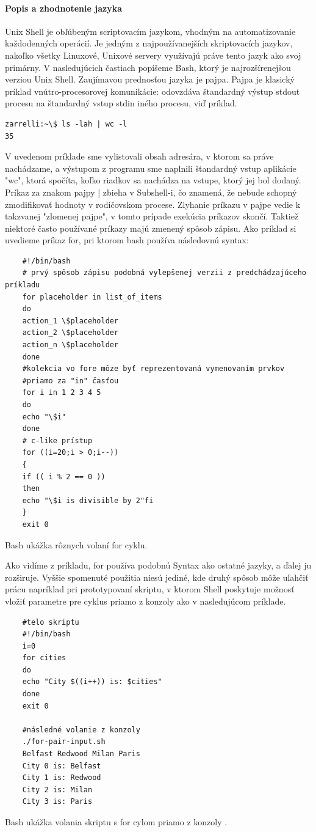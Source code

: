 \paragraph{Popis a zhodnotenie jazyka}
\indent
Unix Shell je obľúbeným scriptovacím jazykom, vhodným na automatizovanie každodenných operácií. Je jedným z najpoužívanejších skriptovacích jazykov, nakoľko všetky Linuxové, Unixové servery využívajú práve tento jazyk ako svoj primárny. V nasledujúcich častiach popíšeme Bash, ktorý je najrozšírenejšou verziou Unix Shell. Zaujímavou prednosťou jazyka je pajpa. Pajpa je klasický príklad vnútro-procesorovej komunikácie: odovzdáva štandardný výstup stdout procesu na štandardný vstup stdin iného procesu, viď príklad.
\begin{verbatim}
zarrelli:~\$ ls -lah | wc -l
35
\end{verbatim}
V uvedenom príklade sme vylistovali obsah adresára, v ktorom sa práve nachádzame, a výstupom z programu sme naplnili štandardný vstup aplikácie "wc", ktorá spočíta, koľko riadkov sa nachádza na vstupe, ktorý jej bol dodaný. Príkaz za znakom pajpy | zbieha v Subshell-i, čo znamená, že nebude schopný zmodifikovať hodnoty v rodičovskom procese. Zlyhanie príkazu v pajpe vedie k takzvanej "zlomenej pajpe", v tomto prípade exekúcia príkazov skončí. \cite{mbash}
\newpage
Taktiež niektoré často používané príkazy majú zmenený spôsob zápisu.
Ako príklad si uvedieme príkaz for, pri ktorom bash používa následovnú syntax:

\begin{algorithm}[H]
	\begin{verbatim}
	#!/bin/bash
	# prvý spôsob zápisu podobná vylepšenej verzii z predchádzajúceho príkladu
	for placeholder in list_of_items
	do
	action_1 \$placeholder
	action_2 \$placeholder
	action_n \$placeholder
	done
	#kolekcia vo fore môze byť reprezentovaná vymenovaním prvkov 
	#priamo za "in" časťou
	for i in 1 2 3 4 5
	do
	echo "\$i"
	done
	# c-like prístup
	for ((i=20;i > 0;i--))
	{
	if (( i % 2 == 0 ))
	then
	echo "\$i is divisible by 2"fi
	}
	exit 0
	\end{verbatim} 
	\caption{Bash ukážka rôznych volaní for cyklu. \cite{mbash}}
	\label{alg:gen}
\end{algorithm}

Ako vidíme z príkladu, for používa podobnú Syntax ako ostatné jazyky, a ďalej ju rozširuje. Vyššie spomenuté použitia niesú jediné, kde druhý spôsob môže uľahčiť prácu napríklad pri prototypovaní skriptu, v ktorom Shell poskytuje možnosť vložiť parametre pre cyklus priamo z konzoly ako v nasledujúcom príklade.
\newpage
\begin{algorithm}[H]
	\begin{verbatim}
	#telo skriptu
	#!/bin/bash
	i=0
	for cities 
	do
	echo "City $((i++)) is: $cities"
	done
	exit 0
	
	#následné volanie z konzoly
	./for-pair-input.sh 
	Belfast Redwood Milan Paris
	City 0 is: Belfast
	City 1 is: Redwood
	City 2 is: Milan
	City 3 is: Paris
	\end{verbatim}
	\caption{Bash ukážka volania skriptu s for cylom priamo z konzoly . \cite{mbash}}
	\label{alg:gen}
\end{algorithm}

